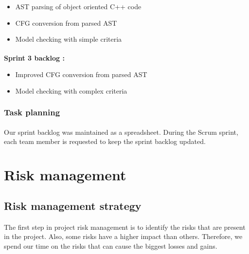 \documentclass{report}
\begin{document}
\vspace{3mm}
\begin{itemize}
\item AST parsing of object oriented C++ code\vspace{1mm}
\item CFG conversion from parsed AST\vspace{1mm}
\item Model checking with simple criteria\vspace{1mm}
\end{itemize}

\paragraph{}
\hspace{4mm}\textnormal{\textbf{Sprint 3 backlog :}}

\vspace{3mm}
\begin{itemize}
\item Improved CFG conversion from parsed AST\vspace{1mm}
\item Model checking with complex criteria\vspace{1mm}
\end{itemize}

\subsubsection{Task planning}

\paragraph{}
\hspace{4mm}\textnormal{Our sprint backlog was maintained as a spreadsheet. 
During the Scrum sprint, each team member is requested to 
keep the sprint backlog updated.}

\section{Risk management}

\subsection{Risk management strategy}

\paragraph{}
\hspace{4mm}\textnormal{The first step in project risk management is to identify the risks
 that are present in the project. Also, some risks have a higher impact than others.
 Therefore, we spend our time on the risks that can cause the 
biggest losses and gains.}
\end{document}
